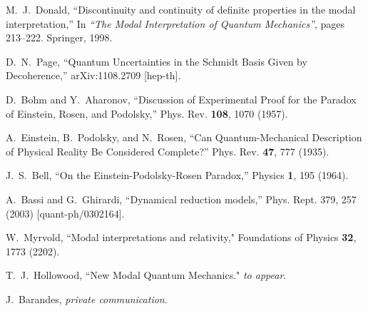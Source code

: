 \documentclass[%
preprint,
nofootinbib,
 amsmath,amssymb,
aps,
]{revtex4-1}
\begin{document}
\begin{thebibliography}{10}
M.~J.~Donald,
   ``Discontinuity and continuity of definite properties in the modal
  interpretation,''
   In {\em {``The Modal Interpretation of Quantum Mechanics''}}, pages
  213--222. Springer, 1998.

  D.~N.~Page,
  ``Quantum Uncertainties in the Schmidt Basis Given by Decoherence,''
  arXiv:1108.2709 [hep-th].

D.~Bohm and Y.~Aharonov,
   {``Discussion of Experimental Proof for the Paradox of Einstein,
  Rosen, and Podolsky,''}
   Phys. Rev. {\bf108}, 1070 (1957).

A.~Einstein, B.~Podolsky, and N.~Rosen,
   ``Can Quantum-Mechanical Description of Physical Reality Be
  Considered Complete?''
   Phys. Rev. {\bf47}, 777 (1935).

J.~S.~Bell, 
   ``On the Einstein-Podolsky-Rosen Paradox,''
   Physics {\bf1}, 195 (1964).


A.~Bassi and G.~Ghirardi, ``Dynamical reduction models,'' Phys. Rept. 379, 257 (2003)  [quant-ph/0302164].

W.~Myrvold,  ``Modal interpretations and relativity," Foundations of Physics {\bf32}, 1773 (2202).

T.~J.~Hollowood, ``New Modal Quantum Mechanics." {\it to appear\/}.


J.~Barandes, {\sl private communication\/}.

\end{thebibliography}
\end{document}
